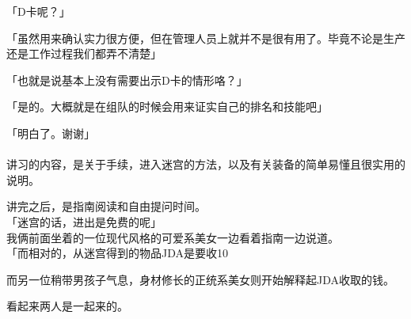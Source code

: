 「D卡呢？」

「虽然用来确认实力很方便，但在管理人员上就并不是很有用了。毕竟不论是生产还是工作过程我们都弄不清楚」

「也就是说基本上没有需要出示D卡的情形咯？」

「是的。大概就是在组队的时候会用来证实自己的排名和技能吧」

「明白了。谢谢」\\

\sqsplit\\

讲习的内容，是关于手续，进入迷宫的方法，以及有关装备的简单易懂且很实用的说明。

讲完之后，是指南阅读和自由提问时间。\\

「迷宫的话，进出是免费的呢」\\

我俩前面坐着的一位现代风格的可爱系美女一边看着指南一边说道。\\

「而相对的，从迷宫得到的物品JDA是要收10%

而另一位稍带男孩子气息，身材修长的正统系美女则开始解释起JDA收取的钱。

看起来两人是一起来的。\\

